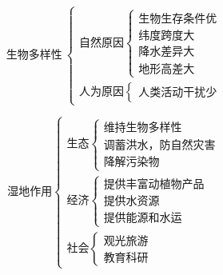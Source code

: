 \documentclass[UTF8]{ctexart}
\begin{document}
\begin{multicols}{2}

    \[
        \textbf{生物多样性}\
        \begin{cases}
            \text{自然原因}
            \begin{cases}
                \text{生物生存条件优}\\
                \text{纬度跨度大}\\
                \text{降水差异大}\\
                \text{地形高差大}
            \end{cases}\\
            \text{人为原因}
            \begin{cases}
                \text{人类活动干扰少}
            \end{cases}
        \end{cases}
    \]

    \[
        \textbf{湿地作用}
        \begin{cases}
            \text{生态}
            \begin{cases}
                \text{维持生物多样性}\\
                \text{调蓄洪水，防自然灾害}\\
                \text{降解污染物}
            \end{cases}\\
            \text{经济}
            \begin{cases}
                \text{提供丰富动植物产品}\\
                \text{提供水资源}\\
                \text{提供能源和水运}
            \end{cases}\\
            \text{社会}
            \begin{cases}
                \text{观光旅游}\\
                \text{教育科研}
            \end{cases}
        \end{cases}
    \]
    
\end{multicols}

\par
\end{document}
